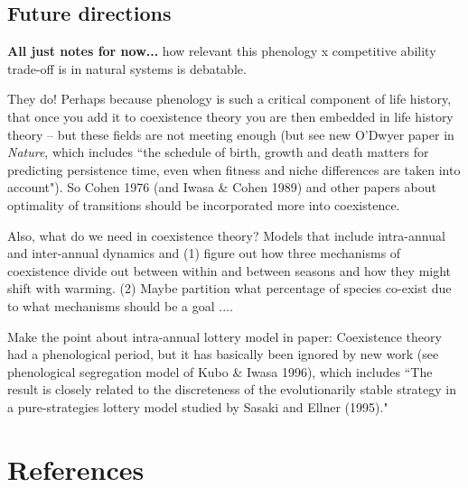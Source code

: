 \documentclass[11pt]{article}
\begin{document}
\subsection*{Future directions}

{\bf All just notes for now...}
 how relevant this phenology x competitive ability  trade-off is in natural systems is debatable. 


They do! Perhaps because phenology is such a critical component of life history, that once you add it to coexistence theory you are then embedded in life history theory -- but these fields are not meeting enough (but see new O'Dwyer paper in \emph{Nature}, which includes ``the schedule of birth, growth and death matters for predicting persistence time, even when fitness and niche differences are taken into account"). So Cohen 1976 (and Iwasa \& Cohen 1989) and other papers about optimality of transitions should be incorporated more into coexistence. 

Also, what do we need in coexistence theory? Models that include intra-annual and inter-annual dynamics and (1) figure out how three mechanisms of coexistence divide out between within and between seasons and how they might shift with warming. (2) Maybe partition what percentage of species co-exist due to what mechanisms should be a goal .... 

Make the point about intra-annual lottery model in paper: Coexistence theory had a phenological period, but it has basically been ignored by new work (see phenological segregation model of Kubo \& Iwasa 1996), which includes ``The result is closely related to the discreteness of the evolutionarily stable strategy in a pure-strategies lottery model studied by Sasaki and Ellner (1995)." 

\newpage
\section{References}


\newpage
\end{document}
